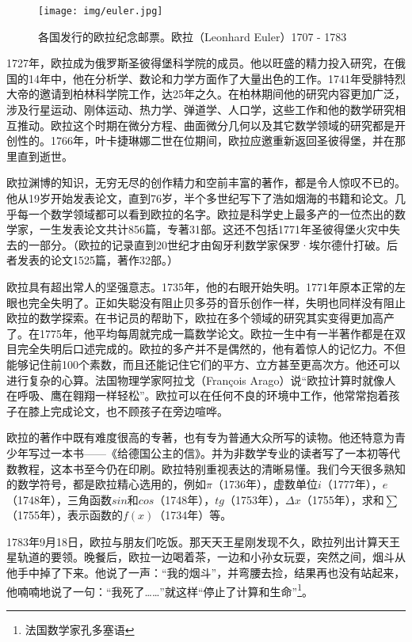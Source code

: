 \documentclass[b5paper]{ctexart}
\begin{document}
\begin{figure}[htbp]
 \centering
 \texttt{[image: img/euler.jpg]}
 \captionsetup{labelformat=empty}
 \caption{各国发行的欧拉纪念邮票。欧拉（Leonhard Euler）1707 - 1783}
 \label{fig:Leonhard-Euler}
\end{figure}

1727年，欧拉成为俄罗斯圣彼得堡科学院的成员。他以旺盛的精力投入研究，在俄国的14年中，他在分析学、数论和力学方面作了大量出色的工作。1741年受腓特烈大帝的邀请到柏林科学院工作，达25年之久。在柏林期间他的研究内容更加广泛，涉及行星运动、刚体运动、热力学、弹道学、人口学，这些工作和他的数学研究相互推动。欧拉这个时期在微分方程、曲面微分几何以及其它数学领域的研究都是开创性的。1766年，叶卡捷琳娜二世在位期间，欧拉应邀重新返回圣彼得堡，并在那里直到逝世。

欧拉渊博的知识，无穷无尽的创作精力和空前丰富的著作，都是令人惊叹不已的。他从19岁开始发表论文，直到76岁，半个多世纪写下了浩如烟海的书籍和论文。几乎每一个数学领域都可以看到欧拉的名字。欧拉是科学史上最多产的一位杰出的数学家，一生发表论文共计856篇，专著31部。这还不包括1771年圣彼得堡火灾中失去的一部分。（欧拉的记录直到20世纪才由匈牙利数学家保罗·埃尔德什打破。后者发表的论文1525篇，著作32部。\cite{Wiki-Euler}）

欧拉具有超出常人的坚强意志。1735年，他的右眼开始失明。1771年原本正常的左眼也完全失明了。正如失聪没有阻止贝多芬的音乐创作一样，失明也同样没有阻止欧拉的数学探索\cite{HanXueTao2009}。在书记员的帮助下，欧拉在多个领域的研究其实变得更加高产了。在1775年，他平均每周就完成一篇数学论文。欧拉一生中有一半著作都是在双目完全失明后口述完成的。欧拉的多产并不是偶然的，他有着惊人的记忆力。不但能够记住前100个素数，而且还能记住它们的平方、立方甚至更高次方。他还可以进行复杂的心算。法国物理学家阿拉戈（François Arago）说“欧拉计算时就像人在呼吸、鹰在翱翔一样轻松”。欧拉可以在任何不良的环境中工作，他常常抱着孩子在膝上完成论文，也不顾孩子在旁边喧哗。

欧拉的著作中既有难度很高的专著，也有专为普通大众所写的读物。他还特意为青少年写过一本书——《给德国公主的信》。并为非数学专业的读者写了一本初等代数教程，这本书至今仍在印刷。欧拉特别重视表达的清晰易懂。我们今天很多熟知的数学符号，都是欧拉精心选用的，例如$\pi$（1736年），虚数单位$i$（1777年），$e$（1748年），三角函数$sin$和$cos$（1748年），$tg$（1753年），$\Delta x$（1755年），求和$\sum$（1755年），表示函数的$f(x)$（1734年）等\cite{HanXueTao2009}。

1783年9月18日，欧拉与朋友们吃饭。那天天王星刚发现不久，欧拉列出计算天王星轨道的要领。晚餐后，欧拉一边喝着茶，一边和小孙女玩耍，突然之间，烟斗从他手中掉了下来。他说了一声：“我的烟斗”，并弯腰去捡，结果再也没有站起来，他喃喃地说了一句：“我死了……”就这样“停止了计算和生命”\footnote{法国数学家孔多塞语}。
\end{document}
